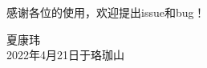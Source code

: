 \Acknowledgements


感谢各位的使用，欢迎提出issue和bug！

\begin{signature}
  夏康玮 \\
  2022年4月21日于珞珈山
\end{signature}